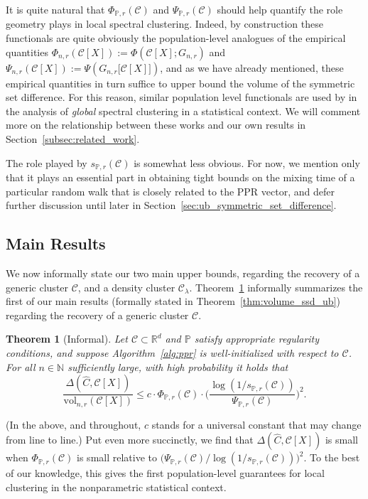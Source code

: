 \documentclass[11pt,twoside]{article}
\newtheorem{theorem}{Theorem}
\theoremstyle{definition}
\newcommand{\Reals}{\mathbb{R}}
\newcommand{\1}{\mathbf{1}}
\newcommand{\Rd}{\Reals^d}
\newcommand{\mc}[1]{\mathcal{#1}}
\newcommand{\Pbb}{\mathbb{P}}
\newcommand{\wh}[1]{\widehat{#1}}
\newcommand{\vol}{\mathrm{vol}}
\begin{document}
It is quite natural that $\Phi_{\Pbb,r}(\mc{C})$ and $\Psi_{\Pbb,r}(\mc{C})$ should help quantify the role geometry plays in local spectral clustering. Indeed, by construction these functionals are quite obviously the population-level analogues of the empirical quantities $\Phi_{n,r}(\mc{C}[X]) := \Phi(\mc{C}[X];G_{n,r})$ and $\Psi_{n,r}(\mc{C}[X]) := \Psi(G_{n,r}\bigl[\mc{C}[X]\bigr])$, and as we have already mentioned, these empirical quantities in turn suffice to upper bound the volume of the symmetric set difference. For this reason, similar population level functionals are used by \citep{shi2009,schiebinger2015,garciatrillos19} in the analysis of \emph{global} spectral clustering in a statistical context. We will comment more on the relationship between these works and our own results in Section~\ref{subsec:related_work}. 

The role played by $s_{\Pbb,r}(\mc{C})$ is somewhat less obvious. For now, we mention only that it plays an essential part in obtaining tight bounds on the mixing time of a particular random walk that is closely related to the PPR vector, and defer further discussion until later in Section~\ref{sec:ub_symmetric_set_difference}.

\subsection{Main Results}
We now informally state our two main upper bounds, regarding the recovery of a generic cluster $\mc{C}$, and a density cluster $\mc{C}_{\lambda}$. Theorem~\ref{thm:volume_ssd_ub_informal} informally summarizes the first of our main results (formally stated in Theorem~\ref{thm:volume_ssd_ub}) regarding the recovery of a generic cluster $\mc{C}$.
\begin{theorem}[Informal]
	\label{thm:volume_ssd_ub_informal}
	Let $\mc{C} \subset \Rd$ and $\Pbb$ satisfy appropriate regularity conditions, and suppose Algorithm~\ref{alg:ppr} is well-initialized with respect to $\mc{C}$. For all $n \in \mathbb{N}$ sufficiently large, with high probability it holds that
	\begin{equation*}
	\frac{\Delta(\wh{C},\mc{C}[X])}{\vol_{n,r}(\mc{C}[X])} \leq c \cdot\Phi_{\Pbb,r}(\mc{C}) \cdot  \biggl(\frac{\log(1/s_{\Pbb,r}(\mc{C}))}{\Psi_{\Pbb,r}(\mc{C})}\biggr)^2.
	\end{equation*}
\end{theorem}
(In the above, and throughout, $c$ stands for a universal constant that may change from line to line.) Put even more succinctly, we find that $\Delta(\wh{C},\mc{C}[X])$ is small when $\Phi_{\Pbb,r}(\mc{C})$ is small relative to $\bigl(\Psi_{\Pbb,r}(\mc{C})/\log(1/s_{\Pbb,r}(\mc{C}))\bigr)^2$. To the best of our knowledge, this gives the first population-level guarantees for local clustering in the nonparametric statistical context.
\end{document}
